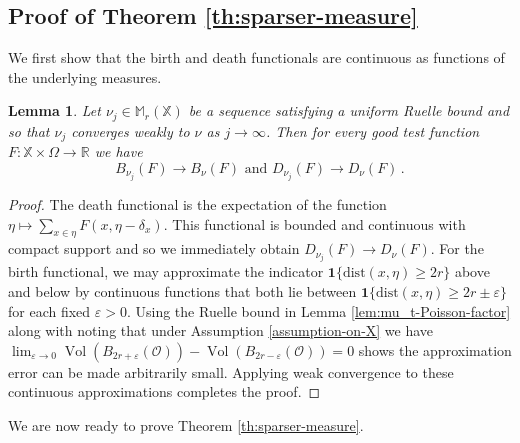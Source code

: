 \documentclass[11pt]{amsart}
\newtheorem{lemma}[theorem]{Lemma}
\theoremstyle{definition}
\theoremstyle{remark}
\newcommand{\R}{\mathbb{R}}
\newcommand{\M}{\mathbb{M}}
\newcommand{\bX}{\mathbb{X}}
\newcommand{\Vol}{\operatorname{Vol}}
\newcommand{\dist}{\mathrm{dist}}
\newcommand{\eps}{\varepsilon}
\newcommand{\one}{\mathbf{1}}
\begin{document}
\subsection{Proof of Theorem \texorpdfstring{\ref{th:sparser-measure}}{32}}

We first show that the birth and death functionals are continuous as functions of the underlying measures.


\begin{lemma}\label{lem:continuity-BD}
    Let $\nu_j \in \M_r(\bX)$ be a sequence satisfying a uniform Ruelle bound and so that $\nu_j$ converges weakly to $\nu$ as $j\to\infty$.  Then for every good test function $F: \bX \times \Omega \to \R$  we have $$B_{\nu_j}(F) \to B_\nu(F) \text{ and } D_{\nu_j}(F) \to D_\nu(F)\,.$$
\end{lemma}
\begin{proof}
    The death functional is the expectation of the function $\eta \mapsto \sum_{x \in \eta} F(x,\eta - \delta_x)$.  This functional is bounded and continuous with compact support and so we immediately obtain $D_{\nu_j}(F) \to D_\nu(F)$.  For the birth functional, we may approximate the indicator $\one\{\dist(x,\eta) \geq 2r\}$ above and below by continuous functions that both lie between $\one\{\dist(x,\eta) \geq 2r \pm \eps\}$ for each fixed $\eps > 0$.  Using the Ruelle bound in Lemma \ref{lem:mu_t-Poisson-factor} along with noting that under Assumption \ref{assumption-on-X} we have $\lim_{\eps \to 0}\Vol(B_{2r+\eps}(\mathcal{O})) - \Vol(B_{2r-\eps}(\mathcal{O})) = 0$ shows the approximation error can be made arbitrarily small.  Applying weak convergence to these continuous approximations completes the proof. 
\end{proof}

We are now ready to prove Theorem \ref{th:sparser-measure}.
\end{document}

